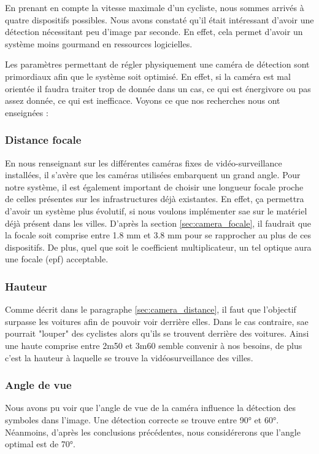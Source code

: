 En prenant en compte la vitesse maximale d'un cycliste, nous sommes arrivés à quatre dispositifs possibles. Nous avons constaté qu'il était intéressant
d'avoir une détection nécessitant peu d'image par seconde. En effet, cela permet d'avoir un système moins gourmand en ressources logicielles.

Les paramètres permettant de régler physiquement une caméra de détection sont primordiaux afin que le système soit optimisé.
En effet, si la caméra est mal orientée il faudra traiter trop de donnée dans un cas, ce qui est énergivore ou pas assez donnée, ce qui est inefficace.
Voyons ce que nos recherches nous ont enseignées :

\subsubsection*{Distance focale}
En nous renseignant sur les différentes caméras fixes de vidéo-surveillance installées, il s’avère que les caméras utilisées embarquent un grand angle.
Pour notre système, il est également important de choisir une longueur focale proche de celles présentes sur les infrastructures déjà existantes.
En effet, ça permettra d'avoir un système plus évolutif, si nous voulons implémenter \gls{sae} sur le matériel déjà présent dans les villes.
D'après la section \ref{sec:camera_focale}, il faudrait que la focale soit comprise entre 1.8 mm et 3.8 mm pour se rapprocher au plus de ces dispositifs.
De plus, quel que soit le coefficient multiplicateur, un tel optique aura une focale (\gls{epf}) acceptable.

\subsubsection*{Hauteur}

Comme décrit dans le paragraphe \ref{sec:camera_distance}, il faut que l'objectif surpasse les voitures afin de pouvoir voir derrière elles.
Dans le cas contraire, \gls{sae} pourrait "louper" des cyclistes alors qu'ils se trouvent derrière des voitures.
Ainsi une haute comprise entre 2m50 et 3m60 semble convenir à nos besoins, de plus c'est la hauteur à laquelle se trouve la vidéosurveillance des villes.

\subsubsection*{Angle de vue}
Nous avons pu voir que l'angle de vue de la caméra influence la détection des symboles dans l'image. Une détection correcte se trouve entre 90° et 60°.
Néanmoins, d'après les conclusions précédentes, nous considérerons que l'angle optimal est de 70°.

